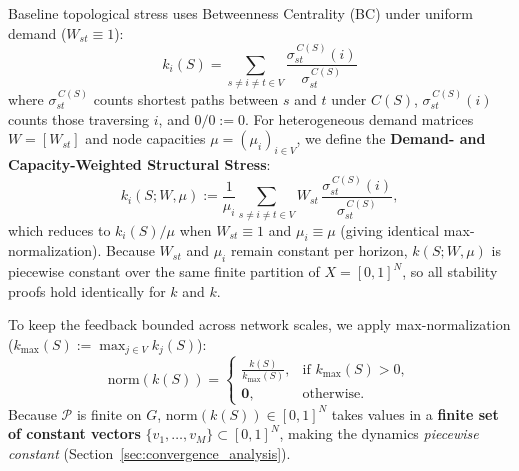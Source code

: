 \documentclass{ccjnl}
\newcommand{\rev}[1]{{\color{blue}#1}}
\def\rev#1{#1}%
\def\widetilde#1{#1}%
\def\kappa{k}%
\begin{document}
Baseline topological stress uses Betweenness Centrality (BC) \cite{Brandes2001Faster} under uniform demand ($W_{st} \equiv 1$):
\begin{equation}
    \label{eq:bc_definition}
    \kappa_i(S) = \sum_{s\neq i\neq t\in V} \frac{\sigma^{\,C(S)}_{st}(i)}{\sigma^{\,C(S)}_{st}}
\end{equation}
where $\sigma^{\,C(S)}_{st}$ counts shortest paths between $s$ and $t$ under $C(S)$, $\sigma^{\,C(S)}_{st}(i)$ counts those traversing $i$, \rev{and $0/0 := 0$}.
\rev{For heterogeneous demand matrices $W = [W_{st}]$ and node capacities $\mu = (\mu_i)_{i \in V}$, we define the \textbf{Demand- and Capacity-Weighted Structural Stress}:
\begin{equation}
    \label{eq:generalized_stress}
    \widetilde{\kappa}_i(S; W, \mu) := \frac{1}{\mu_i} \sum_{s\neq i\neq t\in V} W_{st}\,\frac{\sigma^{\,C(S)}_{st}(i)}{\sigma^{\,C(S)}_{st}},
\end{equation}
which reduces to $\kappa_i(S)/\mu$ when $W_{st}\equiv 1$ and $\mu_i \equiv \mu$ (giving identical max-normalization). Because $W_{st}$ and $\mu_i$ remain constant per horizon, $\widetilde{\kappa}(S; W, \mu)$ is piecewise constant over the same finite partition of $X=[0,1]^N$, so all stability proofs hold identically for $\kappa$ and $\widetilde{\kappa}$.}

To keep the feedback bounded across network scales, we apply max-normalization ($\kappa_{\max}(S) := \max_{j \in V} \kappa_j(S)$):
\begin{equation}
    \label{eq:bc_normalization}
    \mathrm{norm}(\kappa(S)) =
    \begin{cases}
    \displaystyle \frac{\kappa(S)}{\kappa_{\max}(S)}, & \text{if } \kappa_{\max}(S) > 0,\\[6pt]
    \mathbf{0}, & \text{otherwise.}
    \end{cases}
\end{equation}
Because $\mathcal{P}$ is finite on $G$, $\mathrm{norm}(\kappa(S)) \in [0,1]^N$ takes values in a \textbf{finite set of constant vectors} \rev{$\{v_1, \dots, v_M\} \subset [0,1]^N$}, making the dynamics \textit{piecewise constant} (Section~\ref{sec:convergence_analysis}).
\end{document}
